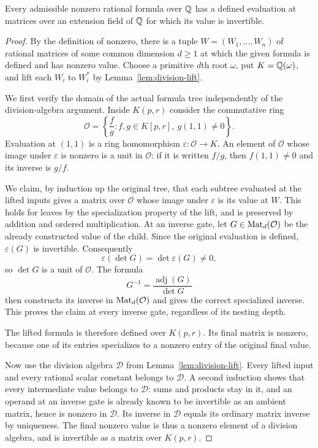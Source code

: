 \begin{lemma}
\label{lem:invertible-witness}
Every admissible nonzero rational formula over $\mathbb Q$ has a defined
evaluation at matrices over an extension field of $\mathbb Q$ for which
its value is invertible.
\end{lemma}

\begin{proof}
By the definition of nonzero, there is a tuple
$W=(W_1,\ldots,W_n)$ of rational matrices of some common dimension
$d\geq1$ at which the given formula is defined and has nonzero
value.  Choose a primitive $d$th root $\omega$, put $K=\mathbb Q(\omega)$,
and lift each $W_i$ to $W_i^*$ by
Lemma~\ref{lem:division-lift}.

We first verify the domain of the actual formula tree independently
of the division-algebra argument.  Inside $K(p,r)$ consider the
commutative ring
\[
  \mathcal O=
  \left\{\frac{f}{g}: f,g\in K[p,r],\ g(1,1)\ne0\right\}.
\]
Evaluation at $(1,1)$ is a ring homomorphism
$\varepsilon:\mathcal O\to K$.  An element of $\mathcal O$ whose
image under $\varepsilon$ is nonzero is a unit in $\mathcal O$:
if it is written $f/g$, then $f(1,1)\ne0$ and its inverse is $g/f$.

We claim, by induction up the original tree, that each subtree
evaluated at the lifted inputs gives a matrix over $\mathcal O$
whose image under $\varepsilon$ is its value at $W$.
This holds for leaves by the specialization property of the lift,
and is preserved by addition and ordered multiplication.  At an
inverse gate, let $G\in\operatorname{Mat}_d(\mathcal O)$ be the already
constructed value of the child.  Since the original evaluation is
defined, $\varepsilon(G)$ is invertible.  Consequently
\[
  \varepsilon(\det G)=\det\varepsilon(G)\ne0,
\]
so $\det G$ is a unit of $\mathcal O$.  The formula
\[
  G^{-1}=\frac{\operatorname{adj}(G)}{\det G}
\]
then constructs its inverse in $\operatorname{Mat}_d(\mathcal O)$ and gives the
correct specialized inverse.  This proves the claim at every
inverse gate, regardless of its nesting depth.

The lifted formula is therefore defined over $K(p,r)$.  Its final
matrix is nonzero, because one of its entries specializes to a
nonzero entry of the original final value.

Now use the division algebra $\mathcal D$ from
Lemma~\ref{lem:division-lift}.  Every lifted input and every
rational scalar constant belongs to $\mathcal D$.  A second
induction shows that every intermediate value belongs to
$\mathcal D$: sums and products stay in it, and an operand at an
inverse gate is already known to be invertible as an ambient
matrix, hence is nonzero in $\mathcal D$.  Its inverse in
$\mathcal D$ equals its ordinary matrix inverse by uniqueness.
The final nonzero value is thus a nonzero element of a division
algebra, and is invertible as a matrix over $K(p,r)$.
\end{proof}

